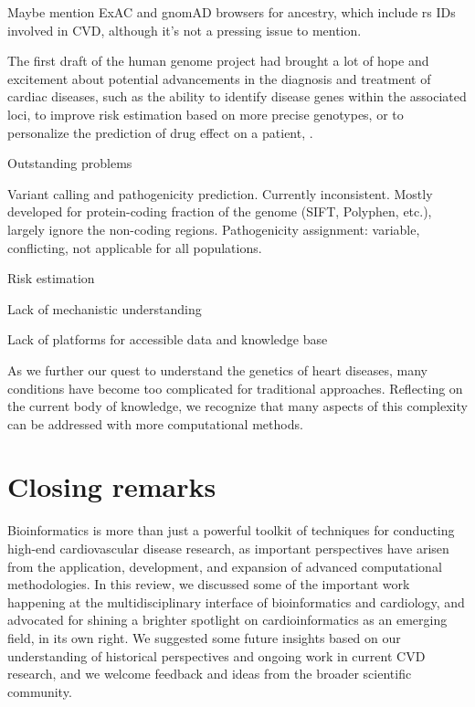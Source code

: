 \documentclass[letter]{bioinfo}
\begin{document}
		
	
	Maybe mention ExAC and gnomAD browsers for ancestry, which include rs IDs involved in CVD, although it's not a pressing issue to mention.
	
	The first draft of the human genome project had brought a lot of hope and excitement about potential advancements in the diagnosis and treatment of cardiac diseases, such as the ability to identify disease genes within the associated loci, to improve risk estimation based on more precise genotypes, or to personalize the prediction of drug effect on a patient, \citep{Komajda:2001:heart}.
	
	
	Outstanding problems
	
	Variant calling and pathogenicity prediction. Currently inconsistent. Mostly developed for protein-coding fraction of the genome (SIFT, Polyphen, etc.), largely ignore the non-coding regions.
	Pathogenicity assignment: variable, conflicting, not applicable for all populations.
	
	Risk estimation
	
	Lack of mechanistic understanding
	
	Lack of platforms for accessible data and knowledge base
	
	
	As we further our quest to understand the genetics of heart diseases, many conditions have become too complicated for traditional approaches. Reflecting on the current body of knowledge, we recognize that many aspects of this complexity can be addressed with more computational methods.
	
	
\section*{Closing remarks}
Bioinformatics is more than just a powerful toolkit of techniques for conducting high-end cardiovascular disease research, as important perspectives have arisen from the application, development, and expansion of advanced computational methodologies.  In this review, we discussed some of the important work happening at the multidisciplinary interface of bioinformatics and cardiology, and advocated for shining a brighter spotlight on cardioinformatics as an emerging field, in its own right.  We suggested some future insights based on our understanding of historical perspectives and ongoing work in current CVD research, and we welcome feedback and ideas from the broader scientific community.
	
\end{document}
